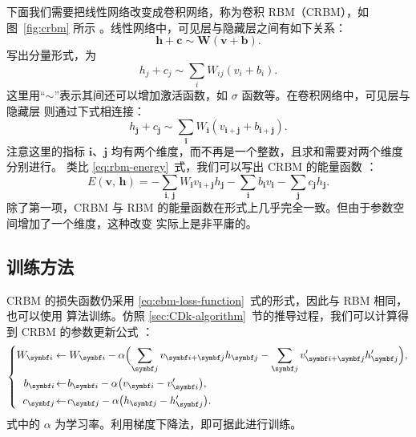 下面我们需要把线性网络改变成卷积网络，称为卷积 RBM（CRBM），如图~\ref{fig:crbm} 所示
\cite{lee2009convolutional,lee2011unsupervised}。线性网络中，可见层与隐藏层之间有如下关系：
\begin{equation}
  \bm{h}+\bm{c} \sim \bm{W} (\bm{v}+\bm{b}).
\end{equation}
写出分量形式，为
\begin{equation}
  h_j+c_j \sim \sum_i W_{ij} (v_i+b_i).
\end{equation}
这里用“$\sim$”表示其间还可以增加激活函数，如 $\sigma$ 函数等。在卷积网络中，可见层与隐藏层
则通过下式相连接：
\begin{equation}
  h_{\bm{j}} + c_{\bm{j}} \sim \sum_{\bm{i}} W_{\bm{i}} (v_{\bm{i}+\bm{j}} + b_{\bm{i}+\bm{j}}).
\end{equation}
注意这里的指标 $\bm{i}$、$\bm{j}$ 均有两个维度，而不再是一个整数，且求和需要对两个维度分别进行。
类比 \eqref{eq:rbm-energy}~式，我们可以写出 CRBM 的能量函数
\cite{lee2009convolutional,lee2011unsupervised}：
\begin{equation}
  E(\bm{v},\,\bm{h})
  = - \sum_{\bm{i},\,\bm{j}} W_{\bm{i}} v_{\bm{i}+\bm{j}} h_{\bm{j}}
    - \sum_{\bm{i}} b_{\bm{i}} v_{\bm{i}} - \sum_{\bm{j}} c_{\bm{j}} h_{\bm{j}}.
\end{equation}
除了第一项，CRBM 与 RBM 的能量函数在形式上几乎完全一致。但由于参数空间增加了一个维度，这种改变
实际上是非平庸的。

\subsection{训练方法}

CRBM 的损失函数仍采用 \eqref{eq:ebm-loss-function}~式的形式，因此与 RBM 相同，也可以使用 \CDk{}
算法训练。仿照 \ref{sec:CDk-algorithm}~节的推导过程，我们可以计算得到 CRBM 的参数更新公式
\cite{lee2009convolutional,lee2011unsupervised}：
\begin{equation}
  \label{eq:crbm-parameters-update}
  \left\{
  \begin{aligned}
    W_{\bm{i}}    &\gets W_{\bm{i}} - \alpha
                         \qty\Big(  \sum_{\bm{j}} v_{\bm{i}+\bm{j}} h_{\bm{j}}
                                  - \sum_{\bm{j}} v'_{\bm{i}+\bm{j}} h'_{\bm{j}}), \\
    b_{\bm{i}} \! &\gets \! b_{\bm{i}} - \alpha \qty\big(v_{\bm{i}} - v'_{\bm{i}}),   \\
    c_{\bm{j}} \! &\gets \! c_{\bm{j}} - \alpha \qty\big(h_{\bm{j}} - h'_{\bm{j}}).
  \end{aligned}
  \right.
\end{equation}
式中的 $\alpha$ 为学习率。利用梯度下降法，即可据此进行训练。


